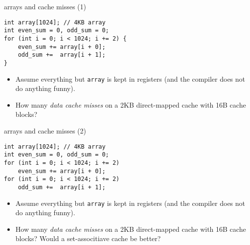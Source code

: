 \begin{frame}[fragile,label=arrayMissesOddEven1]{arrays and cache misses (1)}
\begin{lstlisting}
int array[1024]; // 4KB array
int even_sum = 0, odd_sum = 0;
for (int i = 0; i < 1024; i += 2) {
    even_sum += array[i + 0];
    odd_sum +=  array[i + 1];
}
\end{lstlisting}
    \begin{itemize}
        \item {\small
Assume everything but {\tt array} is kept in registers (and the compiler does not do
            anything funny).}
\item
How many \textit{data cache misses} on a 2KB direct-mapped cache with 16B cache blocks?
    \end{itemize}
\end{frame}

\begin{frame}[fragile,label=arrayMissesOddEven2]{arrays and cache misses (2)}
\begin{lstlisting}
int array[1024]; // 4KB array
int even_sum = 0, odd_sum = 0;
for (int i = 0; i < 1024; i += 2)
    even_sum += array[i + 0];
for (int i = 0; i < 1024; i += 2)
    odd_sum +=  array[i + 1];
\end{lstlisting}
    \begin{itemize}
        \item {\small
    Assume everything but {\tt array} is kept in registers (and the compiler does not do
    anything funny).
        }
    \item
How many \textit{data cache misses} on a 2KB direct-mapped cache with 16B cache blocks?
Would a set-associtiave cache be better?
    \end{itemize}
\end{frame}

